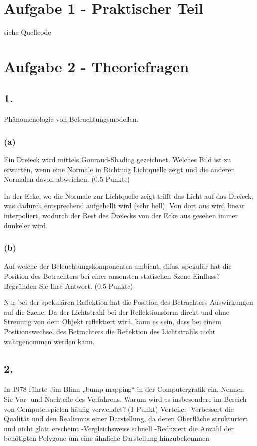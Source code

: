 \documentclass[12pt]{scrreprt}
\begin{document}


\chapter*{Aufgabe 1 - Praktischer Teil}

siehe Quellcode

\chapter*{Aufgabe 2 - Theoriefragen}
\section*{1.}
Phänomenologie von Beleuchtungsmodellen.
\subsection*{(a)}
Ein Dreieck wird mittels Gouraud-Shading gezeichnet. Welches Bild ist zu erwarten, wenn eine Normale in Richtung Lichtquelle zeigt und die anderen Normalen davon abweichen. (0.5 Punkte)

In der Ecke, wo die Normale zur Lichtquelle zeigt trifft das Licht auf das Dreieck, was dadurch entsprechend aufgehellt wird (sehr hell). Von dort aus wird linear interpoliert, wodurch der Rest des Dreiecks von der Ecke aus gesehen immer dunkeler wird.

\subsection*{(b)}
Auf welche der Beleuchtungskomponenten ambient, difus, spekulär hat die Position des Betrachters bei einer ansonsten statischen Szene Einﬂuss? Begründen Sie Ihre Antwort. (0.5 Punkte)

Nur bei der spekulären Reflektion hat die Position des Betrachters Auswirkungen auf die Szene. Da der Lichtstrahl bei der Reflektionsform direkt und ohne Streuung von dem Objekt reflektiert wird, kann es sein, dass bei einem Positionswechsel des Betrachters die Reflektion des Lichtstrahls nicht wahrgenommen werden kann.

\section*{2.}
In 1978 führte Jim Blinn „bump mapping“ in der Computergraﬁk ein. Nennen Sie Vor- und Nachteile des Verfahrens. Warum wird es insbesondere im Bereich von Computerspielen häuﬁg verwendet? (1 Punkt)
Vorteile:
-Verbessert die Qualität und den Realismus einer Darstellung, da deren Oberfläche strukturiert und nicht glatt erscheint
-Vergleichsweise schnell
-Reduziert die Anzahl der benötigten Polygone um eine ähnliche Darstellung hinzubekommen
\end{document}
